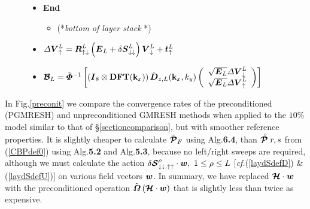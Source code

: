 \begin{figure}
{\begin{minipage} {140.0mm}
\begin{itemize}
\begin{itemize}
\end{itemize}
\item {\bf  End}


\begin{itemize}
\item  (*{\em bottom of layer stack\/ }*) 
\end{itemize}
\item  	$
{\mit \Delta}{{\mbox{\boldmath$\mit V$\unboldmath}}}_{ \uparrow }^{L}=
{\mbox{\boldmath$\mit R$\unboldmath}}_{ \uparrow \downarrow }^{L}
\left({\mbox{\boldmath$\mit E$\unboldmath}}_{L}+{\mit \delta} {\mbox{\boldmath$\mit S$\unboldmath}}^{L}_{\downarrow\downarrow} \right) {{\mbox{\boldmath$\mit V$\unboldmath}}}_{ \downarrow }^{L} +{\mbox{\boldmath$\mit t$\unboldmath}}_{ \uparrow }^{L}$

\item $
{\mbox{\boldmath$\cal B$\unboldmath}}_{L}=\hat{\mbox{\boldmath$\mit \Phi$\unboldmath}}{}^{-1}\left[\left({\mbox{\boldmath$\mit I$\unboldmath}}_8\otimes 
{\bf DFT}({\bf k}_{x}) \right)\hat{\mbox{\boldmath$\mit D$\unboldmath}}_{z,L}({\bf k}_{x},{k}_{y})
\left({\begin{array}{c}
\sqrt{{\mbox{\boldmath$\mit E$\unboldmath}}_{L}}{\mit \Delta}{{\mbox{\boldmath$\mit V$\unboldmath}}}_{ \downarrow }^{L}\\ 
\sqrt{{\mbox{\boldmath$\mit E$\unboldmath}}_{L}}{\mit \Delta}{{\mbox{\boldmath$\mit V$\unboldmath}}}_{ \uparrow }^{L}
\end{array}}\right)\right]
$

\end{itemize}

\vspace{6 mm}
\end{minipage}
}
\end{figure}
\vfill



In Fig.\ref{preconit} we compare the convergence rates of the 
preconditioned (PGMRESH) and unpreconditioned GMRESH methods when applied 
to the 
$10\%$ model similar to that of \S\ref{sectioncomparison}, but with 
smoother reference properties.  It is  slightly cheaper to 
calculate   $\tilde{\mbox{\boldmath$\cal P$\unboldmath}}_F$  using Alg.{\bf 6.4}, 
than $\stackrel{\scriptscriptstyle _{\,\,\circ}}{ \mbox{\boldmath$\cal P$\unboldmath}}{r,s}$ from (\ref{CBPdef0}) using Alg.{\bf 5.2} and 
Alg.{\bf 5.3},
because no left/right sweeps are required, although 
we must calculate the action ${\mit \delta} {\mbox{\boldmath$\cal S$\unboldmath}}^{\rho}_{\downarrow\downarrow,\uparrow\uparrow}\cdot {\mbox{\boldmath$\mit w$\unboldmath}}, \ 1 \le \rho \le L$ [{\em cf.\/}(\ref{laydSdefD}) \&  
(\ref{laydSdefU})] 
on various field vectors ${\mbox{\boldmath$\mit w$\unboldmath}}$. In summary, we have replaced 
${\mbox{\boldmath$\cal H$\unboldmath}}\cdot {\mbox{\boldmath$\mit w$\unboldmath}}$ with the preconditioned operation $\tilde{\mbox{\boldmath$\mit \Omega$\unboldmath}}\left({\mbox{\boldmath$\cal H$\unboldmath}}\cdot {\mbox{\boldmath$\mit w$\unboldmath}}\right)$ that is slightly less than twice as expensive. 

